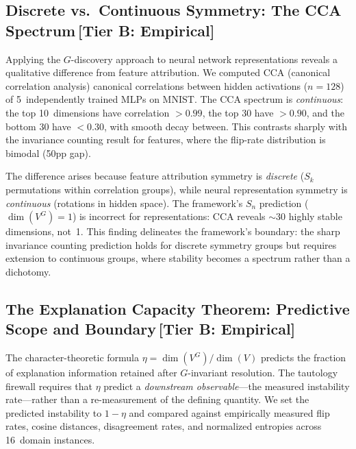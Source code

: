 \documentclass[11pt,a4paper]{article}
\begin{document}
\subsection{Discrete vs.\ Continuous Symmetry: The CCA Spectrum\,\textnormal{\normalsize[Tier B: Empirical]}}
\label{sec:cca-spectrum}

Applying the $G$-discovery approach to neural network representations
reveals a qualitative difference from feature attribution.  We computed CCA
(canonical correlation analysis) canonical correlations between hidden
activations ($n = 128$) of 5~independently trained MLPs on MNIST.  The CCA
spectrum is \emph{continuous}: the top 10~dimensions have correlation
$> 0.99$, the top 30 have $> 0.90$, and the bottom 30 have $< 0.30$, with
smooth decay between.  This contrasts sharply with the invariance counting
result for features, where the flip-rate distribution is bimodal (50pp gap).

The difference arises because feature attribution symmetry is
\emph{discrete} ($S_k$ permutations within correlation groups), while
neural representation symmetry is \emph{continuous} (rotations in hidden
space).  The framework's $S_n$ prediction ($\dim(V^G) = 1$) is incorrect
for representations: CCA reveals $\sim\!30$ highly stable dimensions, not~1.
This finding delineates the framework's boundary: the sharp invariance counting
prediction holds for discrete symmetry groups but requires extension to
continuous groups, where stability becomes a spectrum rather than a
dichotomy.

\subsection{The Explanation Capacity Theorem: Predictive Scope and Boundary\,\textnormal{\normalsize[Tier B: Empirical]}}
\label{sec:universal-eta}

The character-theoretic formula $\eta = \dim(V^G) / \dim(V)$ predicts the
fraction of explanation information retained after $G$-invariant resolution.
The tautology firewall requires that $\eta$ predict a \emph{downstream
observable}---the measured instability rate---rather than a re-measurement
of the defining quantity.  We set the predicted instability to $1 - \eta$ and
compared against empirically measured flip rates, cosine distances,
disagreement rates, and normalized entropies across 16~domain instances.
\end{document}
